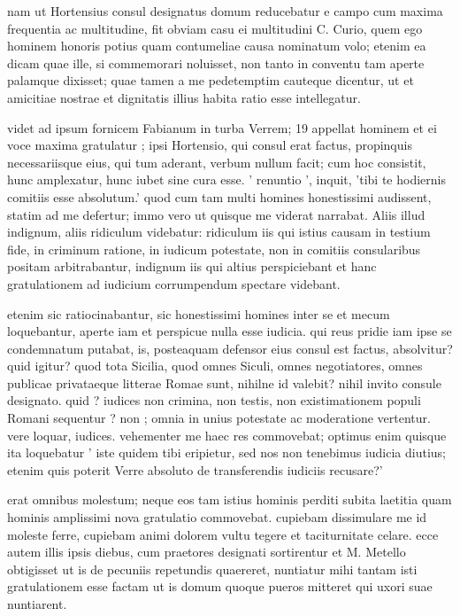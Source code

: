  nam ut Hortensius consul designatus domum reducebatur e campo cum maxima frequentia ac multitudine, fit obviam casu ei multitudini C. Curio, quem ego hominem honoris potius quam contumeliae causa nominatum volo; etenim ea dicam quae ille, si commemorari noluisset, non tanto in conventu tam aperte palamque dixisset; quae tamen a me pedetemptim cauteque dicentur, ut et amicitiae nostrae et dignitatis illius habita ratio esse intellegatur.

 videt ad ipsum fornicem Fabianum in turba Verrem; 19 appellat hominem et ei voce maxima gratulatur ; ipsi Hortensio, qui consul erat factus, propinquis necessariisque eius, qui tum aderant, verbum nullum facit; cum hoc consistit, hunc amplexatur, hunc iubet sine cura esse. ' renuntio ', inquit, 'tibi te hodiernis comitiis esse absolutum.' quod cum tam multi homines honestissimi audissent, statim ad me defertur; immo vero ut quisque me viderat narrabat. Aliis illud indignum, aliis ridiculum videbatur: ridiculum iis qui istius causam in testium fide, in criminum ratione, in iudicum potestate, non in comitiis consularibus positam arbitrabantur, indignum iis qui altius perspiciebant et hanc gratulationem ad iudicium corrumpendum spectare videbant.

 etenim sic ratiocinabantur, sic honestissimi homines inter se et mecum loquebantur, aperte iam et perspicue nulla esse iudicia. qui reus pridie iam ipse se condemnatum putabat, is, posteaquam defensor eius consul est factus, absolvitur? quid igitur? quod tota Sicilia, quod omnes Siculi, omnes negotiatores, omnes publicae privataeque litterae Romae sunt, nihilne id valebit? nihil invito consule designato. quid ? iudices non crimina, non testis, non existimationem populi Romani sequentur ? non ; omnia in unius potestate ac moderatione vertentur. vere loquar, iudices. vehementer me haec res commovebat; optimus enim quisque ita loquebatur ' iste quidem tibi eripietur, sed nos non tenebimus iudicia diutius; etenim quis poterit Verre absoluto de transferendis iudiciis recusare?'

 erat omnibus molestum; neque eos tam istius hominis perditi subita laetitia quam hominis amplissimi nova gratulatio commovebat. cupiebam dissimulare me id moleste ferre, cupiebam animi dolorem vultu tegere et taciturnitate celare. ecce autem illis ipsis diebus, cum praetores designati sortirentur et M. Metello obtigisset ut is de pecuniis repetundis quaereret, nuntiatur mihi tantam isti gratulationem esse factam ut is domum quoque pueros mitteret qui uxori suae nuntiarent.

